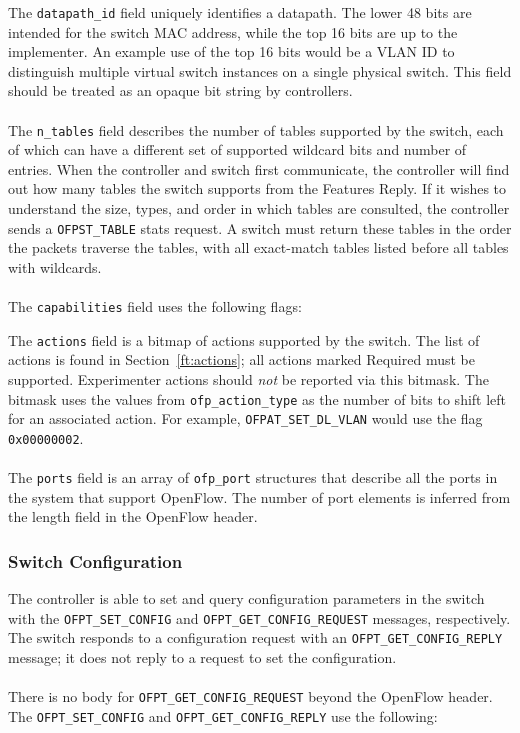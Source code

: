 
The \verb|datapath_id| field uniquely identifies a datapath.  The lower 48 bits are intended for the switch MAC address, while the top 16 bits are up to the implementer.  An example use of the top 16 bits would be a VLAN ID to distinguish multiple virtual switch instances on a single physical switch.  This field should be treated as an opaque bit string by controllers.
\\\\
The \verb|n_tables| field describes the number of tables supported by the switch, each of which can have a different set of supported wildcard bits and number of entries.  When the controller and switch first communicate, the controller will find out how many tables the switch supports from the Features Reply. If it wishes to understand the size, types, and order in which tables are consulted, the controller sends a \verb|OFPST_TABLE| stats request. A switch must return these tables in the order the packets traverse the tables, with all exact-match tables listed before all tables with wildcards.
\\\\
The \verb|capabilities| field uses the following flags:

 
The \verb|actions| field is a bitmap of actions supported by the switch.  The list of actions is found in Section~\ref{ft:actions}; all actions marked Required must be supported. Experimenter actions should \emph{not} be reported via this bitmask. The bitmask uses the values from \verb|ofp_action_type| as the number of bits to shift left for an associated action. For example, \verb|OFPAT_SET_DL_VLAN| would use the flag \verb|0x00000002|.
\\\\
The \verb|ports| field is an array of \verb|ofp_port| structures that describe all the ports in the system that support OpenFlow.  The number of port elements is inferred from the length field in the OpenFlow header. 

\subsubsection{Switch Configuration}
The controller is able to set and query configuration parameters in the switch with the \verb|OFPT_SET_CONFIG| and \verb|OFPT_GET_CONFIG_REQUEST| messages, respectively.  The switch responds to a configuration request with an \verb|OFPT_GET_CONFIG_REPLY| message; it does not reply to a request to set the configuration.  
\\\\
There is no body for \verb|OFPT_GET_CONFIG_REQUEST| beyond the OpenFlow header.  The \verb|OFPT_SET_CONFIG| and \verb|OFPT_GET_CONFIG_REPLY| use the following:


